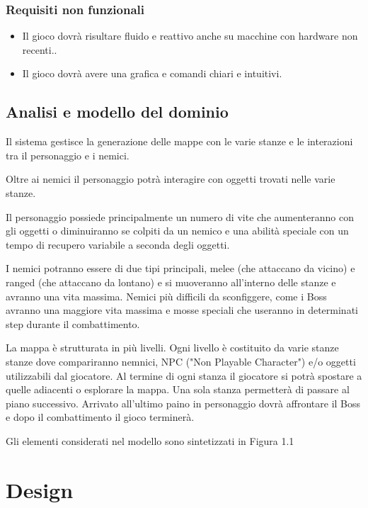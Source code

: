 \documentclass[a4paper,12pt]{report}
\begin{document}
    \subsection{Requisiti non funzionali}
    \begin{itemize}
        \item Il gioco dovrà risultare fluido e reattivo anche su macchine con hardware non recenti..
        \item Il gioco dovrà avere una grafica e comandi chiari e intuitivi.
    \end{itemize}
    \section{Analisi e modello del dominio}
    \par Il sistema gestisce la generazione delle mappe con le varie stanze e le interazioni tra il
    personaggio e i nemici.
    \par Oltre ai nemici il personaggio potrà interagire con oggetti trovati nelle varie stanze.
    \par Il personaggio possiede principalmente un numero di vite che aumenteranno con gli oggetti
    o diminuiranno se colpiti da un nemico e una abilità speciale con un tempo di recupero variabile a seconda degli oggetti.
    \par I nemici potranno essere di due tipi principali, melee (che attaccano da vicino) e ranged (che attaccano da lontano)
    e si muoveranno all'interno delle stanze e avranno una vita massima. Nemici più difficili da sconfiggere,
    come i Boss avranno una maggiore vita massima e mosse speciali che useranno in determinati step durante il combattimento.
    \par La mappa è strutturata in più livelli. Ogni livello è costituito da varie stanze stanze dove compariranno nemnici,
    NPC ("Non Playable Character") e/o oggetti utilizzabili dal giocatore. Al termine di ogni stanza il giocatore si potrà
    spostare a quelle adiacenti o esplorare la mappa. Una sola stanza permetterà di passare al piano successivo.
    Arrivato all'ultimo paino in personaggio dovrà affrontare il Boss e dopo il combattimento il gioco terminerà.
    \par \par Gli elementi considerati nel modello sono sintetizzati in Figura 1.1


    \chapter{Design}
\end{document}
